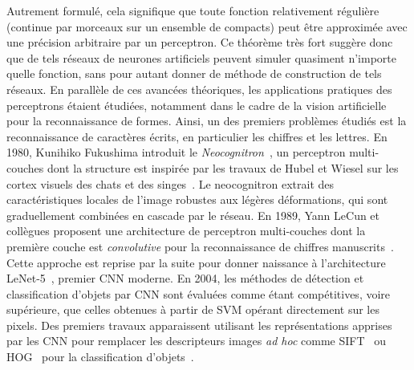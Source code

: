 Autrement formulé, cela signifique que toute fonction relativement régulière (continue par morceaux sur un ensemble de compacts) peut être approximée avec une précision arbitraire par un perceptron. Ce théorème très fort suggère donc que de tels réseaux de neurones artificiels peuvent simuler quasiment n'importe quelle fonction, sans pour autant donner de méthode de construction de tels réseaux. En parallèle de ces avancées théoriques, les applications pratiques des perceptrons étaient étudiées, notamment dans le cadre de la vision artificielle pour la reconnaissance de formes. Ainsi, un des premiers problèmes étudiés est la reconnaissance de caractères écrits, en particulier les chiffres et les lettres. En 1980, Kunihiko Fukushima introduit le \emph{Neocognitron}~\cite{fukushima_neocognitron_1980}, un perceptron multi-couches dont la structure est inspirée par les travaux de Hubel et Wiesel sur les cortex visuels des chats et des singes~\cite{hubel_receptive_1959,hubel_receptive_1968}. Le neocognitron extrait des caractéristiques locales de l'image robustes aux légères déformations, qui sont graduellement combinées en cascade par le réseau. En 1989, Yann LeCun et collègues proposent une architecture de perceptron multi-couches dont la première couche est \emph{convolutive} pour la reconnaissance de chiffres manuscrits~\cite{lecun_backpropagation_1989}. Cette approche est reprise par la suite pour donner naissance à l'architecture LeNet-5~\cite{lecun_gradient-based_1998}, premier \gls{CNN} moderne. En 2004, les méthodes de détection et classification d'objets par \gls{CNN} sont évaluées comme étant compétitives, voire supérieure, que celles obtenues à partir de \gls{SVM} opérant directement sur les pixels. Des premiers travaux apparaissent utilisant les représentations apprises par les \gls{CNN} pour remplacer les descripteurs images \emph{ad hoc} comme \gls{SIFT}~\cite{lowe_object_1999} ou \gls{HOG}~\cite{dalal_histograms_2005} pour la classification d'objets~\cite{serre_object_2005,huang_large-scale_2006}.

